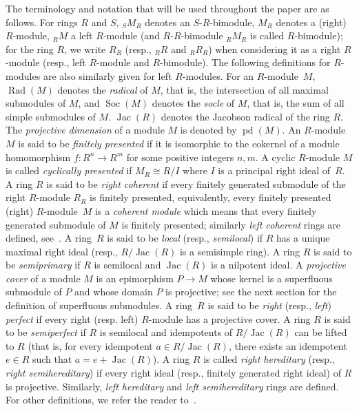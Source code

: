 \documentclass[11pt,a4paper]{amsart}
\theoremstyle{plain}
\theoremstyle{definition}
\theoremstyle{remark}
\newcommand{\Soc}{\operatorname{Soc}}
\newcommand{\Rad}{\operatorname{Rad}}
\newcommand{\Jac}{\operatorname{Jac}}
\newcommand{\pd}{\operatorname{pd}}
\begin{document}
The terminology and notation that will be used throughout the paper are as follows. For rings $R$ and $S$, ${ }_S M_R$ denotes an $S$-$R$-bimodule,  $M_R$ denotes a (right) $R$-module, ${}_R M$ a left $R$-module (and $R$-$R$-bimodule ${}_R M_R$ is called $R$-bimodule); for the ring $R$, we write $R_R$ (resp., ${}_R R$ and ${}_R R_R$) when considering it as a right $R$-module (resp., left $R$-module and $R$-bimodule). The following definitions for $R$-modules are also similarly given for left $R$-modules. For an $R$-module~$M$, $\Rad(M)$ denotes the \emph{radical} of $M$, that is, the intersection of all maximal submodules of $M$, and $ \Soc(M) $ denotes the \emph{socle} of $ M $, that is, the sum of all simple submodules of $ M $. $\Jac(R)$ denotes the Jacobson radical of the ring $ R $. The \emph{projective dimension} of a module $ M $ is denoted by $ \pd(M) $. An $ R $-module $ M $ is said to be \emph{finitely presented} if it is isomorphic to the cokernel of a module homomorphism $ f:R^n \to R^m $ for some positive integers $ n,m $. A cyclic $R$-module $M$ is called \emph{cyclically presented} if $M_R\cong R/I$ where $ I $ is a principal right ideal of~$R$. A ring $ R $ is said to be \emph{right coherent} if every finitely generated submodule of the right $R$-module $ R_R $ is finitely presented, equivalently, every finitely presented (right) $ R $-module~$ M $ is a \emph{coherent module} which means that every finitely generated submodule of $ M $ is finitely presented; similarly \emph{left coherent} rings are defined, see~\cite[\S 4G]{Lam:LecturesOnModulesAndRings}. A ring~$R$ is said to be \emph{local} (resp., \emph{semilocal}) if $R$ has a unique maximal right ideal (resp., $R/\Jac(R)$ is a semisimple ring). A ring $R$ is said to be \emph{semiprimary} if $R$ is semilocal and $\Jac(R)$ is a nilpotent ideal. A \emph{projective cover} of a module $ M $ is an epimorphism $ P\to M $ whose kernel is a superfluous submodule of $ P $ and whose domain $ P $ is projective; see the next section for the definition of superfluous submodules. A ring~$R$ is said to be \emph{right} (resp., \emph{left}) \emph{perfect}  if every right (resp. left) $ R $-module  has a projective cover. A ring $R$ is said to be \emph{semiperfect} if $R$ is semilocal and idempotents of $R/\Jac(R)$ can be lifted to $R$ (that is,  for every idempotent $a \in R/\Jac(R)$, there exists an idempotent $e\in R$ such that $a=e+ \Jac(R)$). A ring $R$ is called \emph{right hereditary} (resp., \emph{right semihereditary}) if every right ideal (resp., finitely generated right ideal) of $R$ is projective. Similarly, \emph{left hereditary} and \emph{left semihereditary} rings are defined. For {other definitions}, {we refer the reader to}~\cite{Anderson-Fuller:RingsandCategoriesofModules, Facchini:ModuleTheory, Kasch:ModulesAndRings,
Lam:LecturesOnModulesAndRings, Lam:AFirstCourseInNoncommutativeRingsSecondEdition}.
\end{document}
